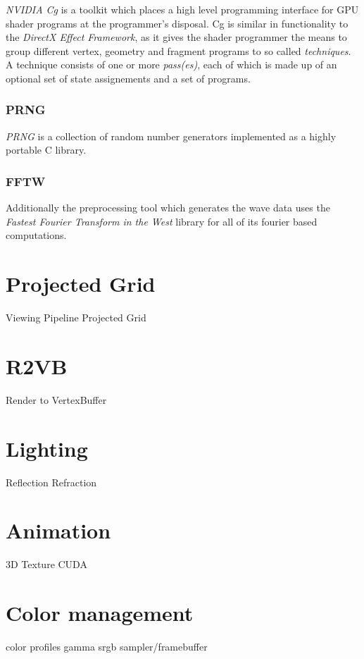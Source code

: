\textit{NVIDIA Cg}\cite{misc:nvcg} is a toolkit which places a high
level programming interface for GPU shader programs at the programmer's
disposal. Cg is similar in functionality to the \textit{DirectX Effect
Framework}\cite{misc:directx}\cite{book:effect-hlsl}, as it gives the
shader programmer the means to group different vertex, geometry and fragment
programs to so called \textit{techniques}. A technique consists of one or more
\textit{pass(es)}, each of which is made up of an optional set of state
assignements and a set of programs.

\subsubsection{PRNG}

\textit{PRNG}\cite{misc:prng} is a collection of random number generators
implemented as a highly portable C library.

\subsubsection{FFTW}
Additionally the preprocessing tool which generates the wave data uses the
\textit{Fastest Fourier Transform in the West} library\cite{misc:fftw} for all
of its fourier based computations.

\section{Projected Grid}
Viewing Pipeline
Projected Grid

\section{R2VB}
Render to VertexBuffer

\section{Lighting}
Reflection
Refraction

\section{Animation}
3D Texture
CUDA

\section{Color management}
color profiles
gamma
srgb sampler/framebuffer